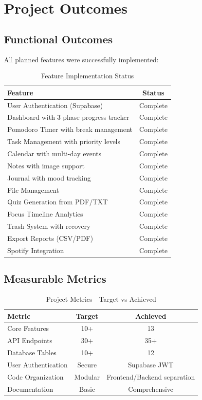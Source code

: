 \section{Project Outcomes}

\subsection{Functional Outcomes}
All planned features were successfully implemented:

\begin{table}[H]
\centering
\begin{tabular}{|l|c|}
\hline
\textbf{Feature} & \textbf{Status} \\
\hline
User Authentication (Supabase) & Complete \\
Dashboard with 3-phase progress tracker & Complete \\
Pomodoro Timer with break management & Complete \\
Task Management with priority levels & Complete \\
Calendar with multi-day events & Complete \\
Notes with image support & Complete \\
Journal with mood tracking & Complete \\
File Management & Complete \\
Quiz Generation from PDF/TXT & Complete \\
Focus Timeline Analytics & Complete \\
Trash System with recovery & Complete \\
Export Reports (CSV/PDF) & Complete \\
Spotify Integration & Complete \\
\hline
\end{tabular}
\caption{Feature Implementation Status}
\end{table}

\subsection{Measurable Metrics}
\begin{table}[H]
\centering
\begin{tabular}{|l|c|c|}
\hline
\textbf{Metric} & \textbf{Target} & \textbf{Achieved} \\
\hline
Core Features & 10+ & 13 \\
API Endpoints & 30+ & 35+ \\
Database Tables & 10+ & 12 \\
User Authentication & Secure & Supabase JWT \\
Code Organization & Modular & Frontend/Backend separation \\
Documentation & Basic & Comprehensive \\
\hline
\end{tabular}
\caption{Project Metrics - Target vs Achieved}
\end{table}

